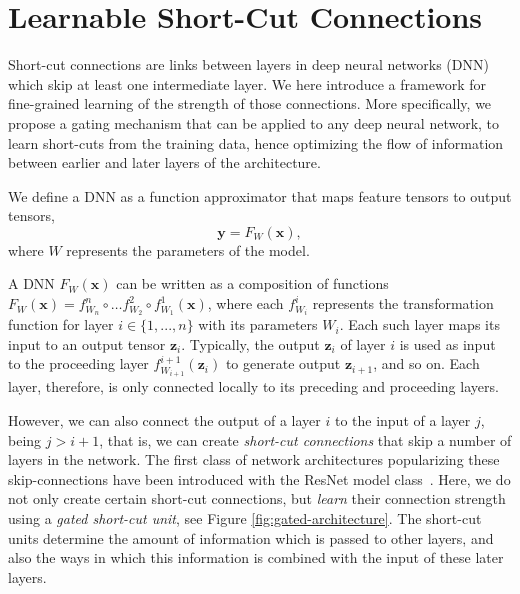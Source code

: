 \documentclass{bmvc2k}
\begin{document}
\section{Learnable Short-Cut Connections}\label{sec:gating_units}

Short-cut connections are links between layers in deep neural networks (DNN) which skip at least one intermediate layer. We here introduce a framework for fine-grained learning of the strength of those connections. More specifically, we propose a gating mechanism that can be applied to any deep neural network, to learn short-cuts from the training data, hence optimizing the flow of information between earlier and later layers of the architecture. 

We define a DNN as a function approximator that maps feature tensors to output tensors,
\begin{equation}
\label{eq:dnn}
\boldsymbol{y} = F_W(\boldsymbol{x}),
\end{equation} 
where $W$ represents the parameters of the model. 

A DNN $F_{W}(\boldsymbol{x})$ can be written as a composition of functions $F_W(\boldsymbol{x}) = f_{W_n}^n \circ \dots f_{W_2}^2 \circ f_{W_1}^1(\boldsymbol{x})$, where each $f^i_{W_i}$ represents the transformation function for layer $i \in \{1, ..., n\}$ with its parameters $W_i$. Each such layer maps its input to an output tensor $\boldsymbol{z}_{i}$. Typically, the output $\boldsymbol{z}_{i}$ of layer $i$  is used as input to the proceeding layer $f^{i+1}_{W_{i+1}}(\boldsymbol{z}_{i})$ to generate output $\boldsymbol{z}_{i+1}$, and so on. Each layer, therefore, is only connected locally to its preceding and proceeding layers.

However, we can also connect the output of a layer $i$ to the input of a layer $j$, being $j > i + 1$, that is, we can create \emph{short-cut connections} that skip a number of layers in the network. The first class of network architectures popularizing these skip-connections have been introduced with the ResNet model class~\cite{he2016deep}. Here, we do not only create certain short-cut connections, but \emph{learn} their connection strength using a \emph{gated short-cut unit}, see Figure \ref{fig:gated-architecture}. The short-cut units determine the amount of information which is passed to other layers, and also the ways in which this information is combined with the input of these later layers. 
\end{document}
